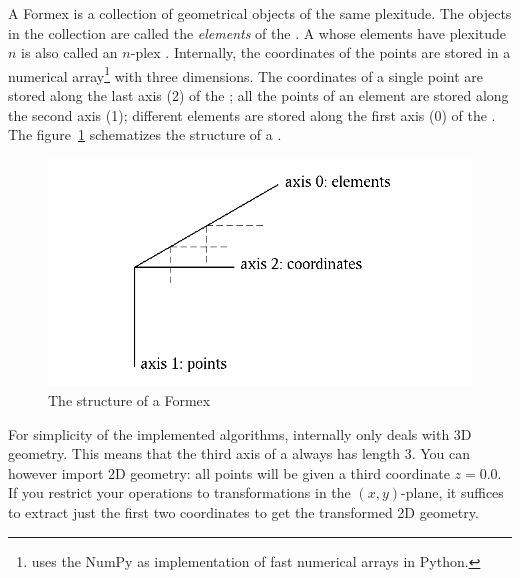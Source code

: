 A Formex is a collection of geometrical objects of the same plexitude. The objects in the collection are called the \emph{elements} of the . A  whose elements have plexitude $n$ is also called an $n$-plex . Internally, the coordinates of the points are stored in a numerical array\footnote{\pyf uses the NumPy  as implementation of fast numerical arrays in Python.} with three dimensions. The coordinates of a single point are stored along the last axis (2) of the ; all the points of an element are stored along the second axis (1); different elements are stored along the first axis (0) of the . The figure~\ref{fig:formex} schematizes the structure of a . 

\begin{figure}[ht]
  \centering
  \begin{makeimage}
  \end{makeimage}
  \begin{latexonly}
    \includegraphics{images/Formex}
  \end{latexonly}
  \begin{htmlonly}
  \end{htmlonly}  
  \caption{The structure of a Formex}
  \label{fig:formex}
\end{figure}


For simplicity of the implemented algorithms, internally \pyf only deals with 3D geometry. This means that the third axis of a  always has length 3. You can however import 2D geometry: all points will be given a third coordinate $z=0.0$. If you restrict your operations to transformations in the $(x,y)$-plane, it suffices to extract just the first two coordinates to get the transformed 2D geometry.

